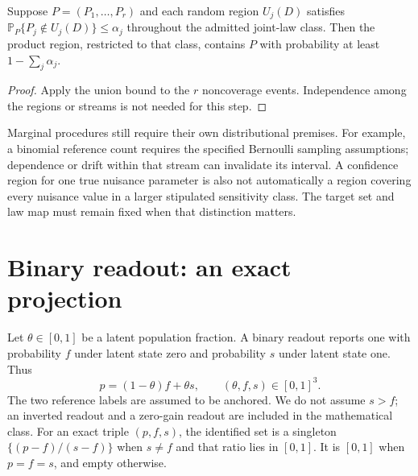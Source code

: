 \documentclass[11pt,a4paper]{article}
\theoremstyle{definition}\newtheorem{definition}[theorem]{Definition}
\newcommand{\Prob}{\mathbb P}\newcommand{\E}{\mathbb E}\newcommand{\Iset}{\mathcal I}\newcommand{\Cset}{\mathcal C}
\begin{document}
\begin{proposition}\label{prop:union}
Suppose $P=(P_1,\ldots,P_r)$ and each random region $U_j(D)$ satisfies $\Prob_P\{P_j\notin U_j(D)\}\le\alpha_j$ throughout the admitted joint-law class. Then the product region, restricted to that class, contains $P$ with probability at least $1-\sum_j\alpha_j$.
\end{proposition}
\begin{proof}
Apply the union bound to the $r$ noncoverage events. Independence among the regions or streams is not needed for this step.
\end{proof}

Marginal procedures still require their own distributional premises. For example, a binomial reference count requires the specified Bernoulli sampling assumptions; dependence or drift within that stream can invalidate its interval. A confidence region for one true nuisance parameter is also not automatically a region covering every nuisance value in a larger stipulated sensitivity class. The target set and law map must remain fixed when that distinction matters.

\section{Binary readout: an exact projection}

Let $\theta\in[0,1]$ be a latent population fraction. A binary readout reports one with probability $f$ under latent state zero and probability $s$ under latent state one. Thus
\begin{equation}\label{eq:model}
p=(1-\theta)f+\theta s,\qquad (\theta,f,s)\in[0,1]^3.
\end{equation}
The two reference labels are assumed to be anchored. We do not assume $s>f$; an inverted readout and a zero-gain readout are included in the mathematical class. For an exact triple $(p,f,s)$, the identified set is a singleton $\{(p-f)/(s-f)\}$ when $s\ne f$ and that ratio lies in $[0,1]$. It is $[0,1]$ when $p=f=s$, and empty otherwise.
\end{document}
